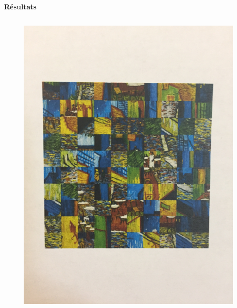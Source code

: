 \documentclass{beamer}
\begin{document}
\begin{frame}[t]
\begin{columns}[t]
\begin{column}{.5\linewidth}
\begin{block}{\centering \textbf{Résultats}}
\begin{columns}[t]
                        \begin{column}{.2\linewidth}
                            \begin{figure}[t]
                                \includegraphics[width=\linewidth]{rsc/van_gogh_picture_10.png}\\
                            \end{figure}
                        \end{column}


\end{columns}
\end{block}
\end{column}
\end{columns}
\end{frame}
\end{document}
